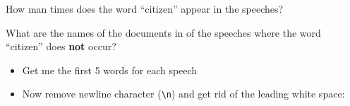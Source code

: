 \documentclass[]{book}
\newenvironment{Shaded}{\begin{snugshade}}{\end{snugshade}}
\newcommand{\CharTok}[1]{\textcolor[rgb]{0.31,0.60,0.02}{#1}}
\newcommand{\DataTypeTok}[1]{\textcolor[rgb]{0.13,0.29,0.53}{#1}}
\newcommand{\DecValTok}[1]{\textcolor[rgb]{0.00,0.00,0.81}{#1}}
\newcommand{\KeywordTok}[1]{\textcolor[rgb]{0.13,0.29,0.53}{\textbf{#1}}}
\newcommand{\NormalTok}[1]{#1}
\newcommand{\OperatorTok}[1]{\textcolor[rgb]{0.81,0.36,0.00}{\textbf{#1}}}
\newcommand{\StringTok}[1]{\textcolor[rgb]{0.31,0.60,0.02}{#1}}
\providecommand{\tightlist}{%
  \setlength{\itemsep}{0pt}\setlength{\parskip}{0pt}}
\begin{document}
How man times does the word ``citizen'' appear in the speeches?

\begin{Shaded}
\end{Shaded}

What are the names of the documents in of the speeches where the word ``citizen'' does \textbf{not} occur?

\begin{Shaded}
\end{Shaded}

\begin{itemize}
\tightlist
\item
  Get me the first 5 words for each speech
\end{itemize}

\begin{Shaded}
\end{Shaded}

\begin{itemize}
\tightlist
\item
  Now remove newline character (\texttt{\textbackslash{}n}) and get rid of the leading white space:
\end{itemize}

\begin{Shaded}
\end{Shaded}
\end{document}
